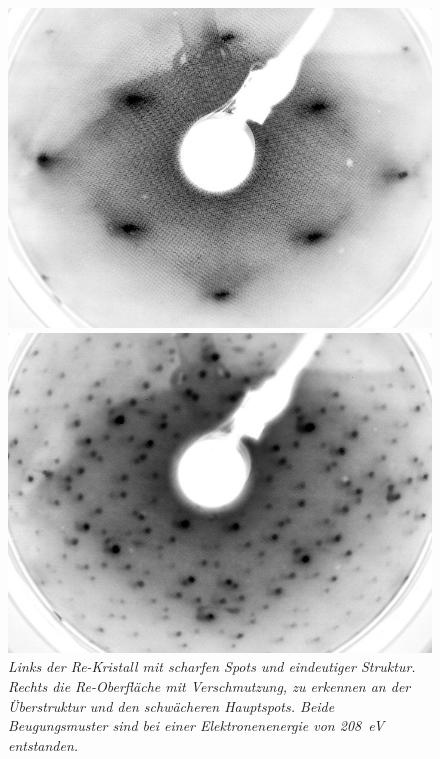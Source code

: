 \begin{figure}[htbp]
	\begin{minipage}[b]{0.5\textwidth} 
		\includegraphics[width=\textwidth]{LEED-Bilder/bearbeitet/unbedampft_E207}
	\end{minipage}
	\hfill
	\begin{minipage}[b]{0.5\textwidth}
		\includegraphics[width=\textwidth]{LEED-Bilder/bearbeitet/unbedampft_E207_MitteKristall.jpg}
	\end{minipage}
	\caption{\textit{Links der Re-Kristall mit scharfen Spots und eindeutiger Struktur. Rechts die
	Re-Oberfläche mit Verschmutzung, zu erkennen an der Überstruktur und den schwächeren Hauptspots.
	Beide Beugungsmuster sind bei einer Elektronenenergie von \SI{208}{eV} entstanden.}}
	\label{rekristall} 
\end{figure}
 


